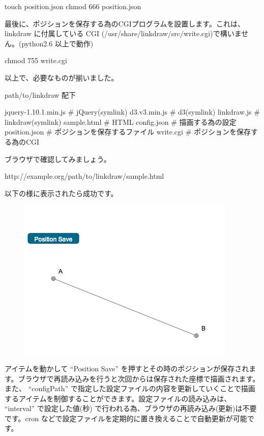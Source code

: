 \documentclass[mingoth,a4paper,twoside]{jsarticle}
\begin{document}
\begin{commandline}
touch position.json
chmod 666 position.json
\end{commandline}

最後に、ポジションを保存する為のCGIプログラムを設置します。これは、linkdraw に付属している CGI (/usr/share/linkdraw/src/write.cgi)で構いません。(python2.6 以上で動作)

\begin{commandline}
chmod 755 write.cgi
\end{commandline}


以上で、必要なものが揃いました。

path/to/linkdraw 配下

\begin{commandline}
    jquery-1.10.1.min.js # jQuery(symlink)
    d3.v3.min.js         # d3(symlink)
    linkdraw.js          # linkdraw(symlink)
    sample.html          # HTML
    config.json          # 描画する為の設定
    position.json        # ポジションを保存するファイル
    write.cgi            # ポジションを保存する為のCGI
\end{commandline}

ブラウザで確認してみましょう。

\begin{commandline}
http://example.org/path/to/linkdraw/sample.html
\end{commandline}

以下の様に表示されたら成功です。

\begin{figure}[h!]
\centering
\includegraphics[width=0.4\hsize]{image2013-gum/mtoshilinkdraw2013061122150-img2.png}
\end{figure}

アイテムを動かして ``Position Save'' を押すとその時のポジションが保存されます。ブラウザで再読み込みを行うと次回からは保存された座標で描画されます。
また、 ``configPath'' で指定した設定ファイルの内容を更新していくことで描画するアイテムを制御することができます。設定ファイルの読み込みは、 ``interval'' で設定した値(秒) で行われる為、ブラウザの再読み込み(更新)は不要です。cron などで設定ファイルを定期的に置き換えることで自動更新が可能です。
\end{document}
